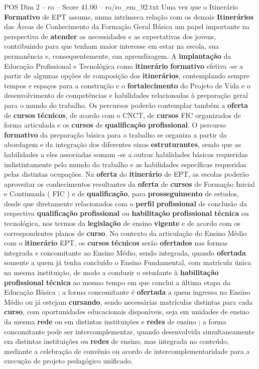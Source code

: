 \begin{textsample}{POS Dim 2 – ro – Score 41.00 – ro/ro\_em\_92.txt}
Uma vez que o Itinerário \textbf{Formativo} de EPT assume, numa intrínseca relação com os demais \textbf{Itinerários} das Áreas de Conhecimento da Formação Geral Básica um papel importante na perspectiva de \textbf{atender} as necessidades e as expectativas dos jovens, contribuindo para que tenham maior interesse em estar na escola, sua permanência e, consequentemente, sua aprendizagem.
A \textbf{implantação} da Educação Profissional e Tecnológica como \textbf{itinerário} \textbf{formativo} efetiva -se a partir de algumas opções de composição dos \textbf{itinerários}, contemplando sempre tempos e espaços para a construção e o \textbf{fortalecimento} do Projeto de Vida e o desenvolvimento de competências e habilidades relacionadas à preparação geral para o mundo do trabalho.
Os percursos poderão contemplar também a \textbf{oferta} de \textbf{cursos} \textbf{técnicos}, de acordo com o CNCT, de \textbf{cursos} FIC organizados de forma articulada e os \textbf{cursos} de \textbf{qualificação} \textbf{profissional}.
O percurso \textbf{formativo} da preparação básica para o trabalho se organiza a partir da abordagem e da integração dos diferentes eixos \textbf{estruturantes}, sendo que as habilidades a eles associadas somam -se a outras habilidades básicas requeridas indistintamente pelo mundo do trabalho e as habilidades específicas requeridas pelas distintas ocupações.
Na \textbf{oferta} do \textbf{itinerário} de EPT, as escolas poderão aproveitar os conhecimentos resultantes da \textbf{oferta} de \textbf{cursos} de Formação Inicial e Continuada ( FIC ) e de \textbf{qualificação}, para \textbf{prosseguimento} de estudos, desde que diretamente relacionados com o \textbf{perfil} \textbf{profissional} de conclusão da respectiva \textbf{qualificação} \textbf{profissional} ou \textbf{habilitação} \textbf{profissional} \textbf{técnica} ou tecnológica, nos termos da \textbf{legislação} de ensino \textbf{vigente} e de acordo com os correspondentes planos de \textbf{curso}.
No contexto da articulação do Ensino Médio com o \textbf{itinerário} EPT, os \textbf{cursos} \textbf{técnicos} serão \textbf{ofertados} nas formas integrada e concomitante ao Ensino Médio, sendo integrada, quando \textbf{ofertada} somente a quem já tenha concluído o Ensino Fundamental, com matrícula única na mesma instituição, de modo a conduzir o estudante à \textbf{habilitação} \textbf{profissional} \textbf{técnica} ao mesmo tempo em que conclui a última etapa da Educação Básica ; a forma concomitante é \textbf{ofertada} a quem ingressa no Ensino Médio ou já estejam \textbf{cursando}, sendo necessárias matrículas distintas para cada \textbf{curso}, com oportunidades educacionais disponíveis, seja em unidades de ensino da mesma \textbf{rede} ou em distintas instituições e \textbf{redes} de ensino ; a forma concomitante pode ser intercomplementar, quando desenvolvida simultaneamente em distintas instituições ou \textbf{redes} de ensino, mas integrada no conteúdo, mediante a celebração de convênio ou acordo de intercomplementaridade para a execução de projeto pedagógico unificado.

\end{textsample}
